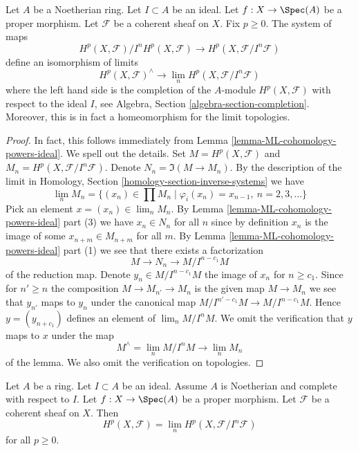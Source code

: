 \begin{theorem}
\label{theorem-formal-functions}
Let $A$ be a Noetherian ring.
Let $I \subset A$ be an ideal.
Let $f : X \to \Spec(A)$ be a proper morphism.
Let $\mathcal{F}$ be a coherent sheaf on $X$.
Fix $p \geq 0$.
The system of maps
$$
H^p(X, \mathcal{F})/I^nH^p(X, \mathcal{F})
\longrightarrow
H^p(X, \mathcal{F}/I^n\mathcal{F})
$$
define an isomorphism of limits
$$
H^p(X, \mathcal{F})^\wedge
\longrightarrow
\lim_n H^p(X, \mathcal{F}/I^n\mathcal{F})
$$
where the left hand side is the completion of the $A$-module
$H^p(X, \mathcal{F})$ with respect to the ideal $I$, see
Algebra, Section \ref{algebra-section-completion}.
Moreover, this is in fact a homeomorphism for the limit topologies.
\end{theorem}

\begin{proof}
In fact, this follows immediately from
Lemma \ref{lemma-ML-cohomology-powers-ideal}. We spell out the details.
Set $M = H^p(X, \mathcal{F})$ and $M_n = H^p(X, \mathcal{F}/I^n\mathcal{F})$.
Denote $N_n = \Im(M \to M_n)$.
By the description of the limit in Homology, Section
\ref{homology-section-inverse-systems} we have
$$
\lim_n M_n
=
\{(x_n) \in \prod M_n \mid \varphi_i(x_n) = x_{n - 1}, \ n = 2, 3, \ldots\}
$$
Pick an element $x = (x_n) \in \lim_n M_n$.
By Lemma \ref{lemma-ML-cohomology-powers-ideal} part (3)
we have $x_n \in N_n$ for all $n$ since by
definition $x_n$ is the image of some $x_{n + m} \in M_{n + m}$ for
all $m$. By Lemma \ref{lemma-ML-cohomology-powers-ideal} part (1)
we see that there exists a factorization
$$
M \to N_n \to M/I^{n - c_1}M
$$
of the reduction map. Denote $y_n \in M/I^{n - c_1}M$ the image of $x_n$
for $n \geq c_1$. Since for $n' \geq n$ the composition
$M \to M_{n'} \to M_n$ is the given map $M \to M_n$ we see that
$y_{n'}$ maps to $y_n$ under the canonical map
$M/I^{n' - c_1}M \to M/I^{n - c_1}M$. Hence $y = (y_{n + c_1})$
defines an element of $\lim_n M/I^nM$.
We omit the verification that $y$ maps to $x$ under the
map
$$
M^\wedge = \lim_n M/I^nM \longrightarrow \lim_n M_n
$$
of the lemma. We also omit the verification on topologies.
\end{proof}

\begin{lemma}
\label{lemma-spell-out-theorem-formal-functions}
Let $A$ be a ring. Let $I \subset A$ be an ideal. Assume $A$ is
Noetherian and complete with respect to $I$.
Let $f : X \to \Spec(A)$ be a proper morphism.
Let $\mathcal{F}$ be a coherent sheaf on $X$.
Then
$$
H^p(X, \mathcal{F}) = \lim_n H^p(X, \mathcal{F}/I^n\mathcal{F})
$$
for all $p \geq 0$.
\end{lemma}

